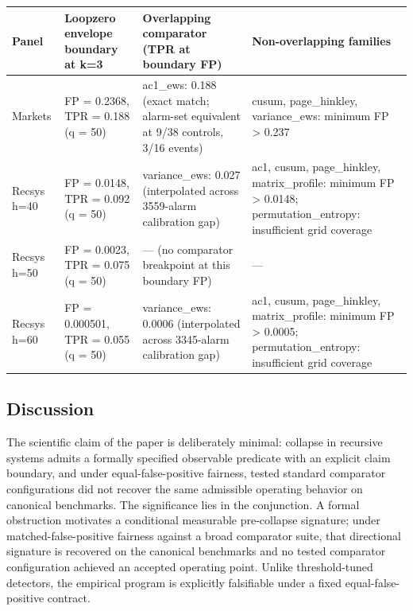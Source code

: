 \documentclass[
  11pt,
]{article}
\newcounter{none} %
\begin{document}
{\def\LTcaptype{none} %
\begin{longtable}[]{@{}
  >{\raggedright\arraybackslash}p{}
  >{\raggedright\arraybackslash}p{}
  >{\raggedright\arraybackslash}p{}
  >{\raggedright\arraybackslash}p{}@{}}
\toprule\noalign{}
\begin{minipage}[b]{\linewidth}\raggedright
Panel
\end{minipage} & \begin{minipage}[b]{\linewidth}\raggedright
Loopzero envelope boundary at k=3
\end{minipage} & \begin{minipage}[b]{\linewidth}\raggedright
Overlapping comparator (TPR at boundary FP)
\end{minipage} & \begin{minipage}[b]{\linewidth}\raggedright
Non-overlapping families
\end{minipage} \\
\midrule\noalign{}
\endhead
\bottomrule\noalign{}
\endlastfoot
Markets & FP = 0.2368, TPR = 0.188 (q = 50) & ac1\_ews: 0.188 (exact
match; alarm-set equivalent at 9/38 controls, 3/16 events) & cusum,
page\_hinkley, variance\_ews: minimum FP \textgreater{} 0.237 \\
Recsys h=40 & FP = 0.0148, TPR = 0.092 (q = 50) & variance\_ews: 0.027
(interpolated across 3559-alarm calibration gap) & ac1, cusum,
page\_hinkley, matrix\_profile: minimum FP \textgreater{} 0.0148;
permutation\_entropy: insufficient grid coverage \\
Recsys h=50 & FP = 0.0023, TPR = 0.075 (q = 50) & --- (no comparator
breakpoint at this boundary FP) & --- \\
Recsys h=60 & FP = 0.000501, TPR = 0.055 (q = 50) & variance\_ews:
0.0006 (interpolated across 3345-alarm calibration gap) & ac1, cusum,
page\_hinkley, matrix\_profile: minimum FP \textgreater{} 0.0005;
permutation\_entropy: insufficient grid coverage \\
\end{longtable}
}

\subsection{Discussion}\label{discussion}

The scientific claim of the paper is deliberately minimal: collapse in
recursive systems admits a formally specified observable predicate with
an explicit claim boundary, and under equal-false-positive fairness,
tested standard comparator configurations did not recover the same
admissible operating behavior on canonical benchmarks. The significance
lies in the conjunction. A formal obstruction motivates a conditional
measurable pre-collapse signature; under matched-false-positive fairness
against a broad comparator suite, that directional signature is
recovered on the canonical benchmarks and no tested comparator
configuration achieved an accepted operating point. Unlike
threshold-tuned detectors, the empirical program is explicitly
falsifiable under a fixed equal-false-positive contract.
\end{document}
